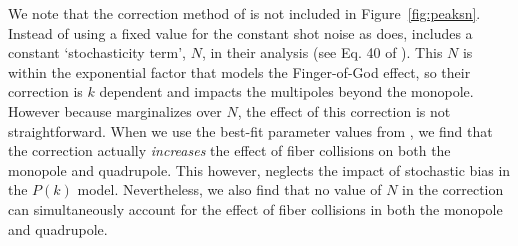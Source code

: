 We note that the correction method of \cite{Beutler:2014aa} 
is not included in Figure~\ref{fig:peaksn}. Instead of using 
a fixed value for the constant shot noise as \cite{Gil-Marin:2014aa} does, 
\cite{Beutler:2014aa} includes a constant `stochasticity term', $N$, 
in their analysis (see Eq. 40 of \citealt{Beutler:2014aa}). This $N$ is 
within the exponential factor that models the Finger-of-God effect, so their 
correction is $k$ dependent and impacts the multipoles beyond the monopole.
However because \cite{Beutler:2014aa} marginalizes over $N$, the effect 
of this correction is not straightforward. When we use the best-fit parameter 
values from \cite{Beutler:2014aa}, we find that the correction actually 
{\em increases} the effect of fiber collisions on both the monopole 
and quadrupole. This however, neglects the impact of stochastic bias 
in the $P(k)$ model. Nevertheless, we also find that no value of $N$ in the 
\cite{Beutler:2014aa} correction can simultaneously 
account for the effect of fiber collisions in both the monopole and quadrupole.




